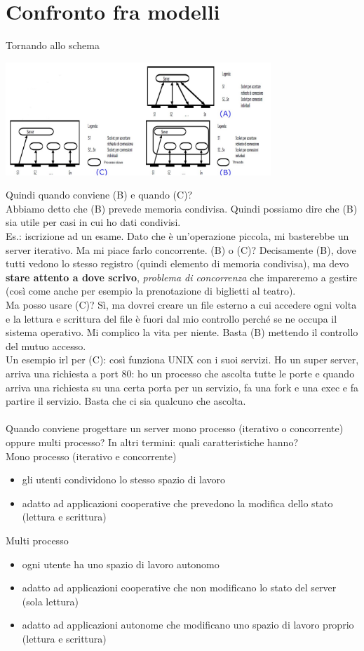 \section{Confronto fra modelli}
Tornando allo schema 
\begin{center}
    \includegraphics[width=0.75\textwidth]{img/serverConcorrenti1.jpg}
\end{center}
Quindi quando conviene (B) e quando (C)?
\\Abbiamo detto che (B) prevede memoria condivisa. Quindi possiamo dire che (B) sia utile per casi in cui ho dati condivisi.
\\Es.: iscrizione ad un esame. Dato che è un'operazione piccola, mi basterebbe un server iterativo. Ma mi piace farlo concorrente. (B) o (C)? Decisamente (B), dove tutti vedono lo stesso registro (quindi elemento di memoria condivisa), ma devo \textbf{stare attento a dove scrivo}, \textit{problema di concorrenza} che impareremo a gestire (così come anche per esempio la prenotazione di biglietti al teatro).
\\Ma posso usare (C)? Sì, ma dovrei creare un file esterno a cui accedere ogni volta e la lettura e scrittura del file è fuori dal mio controllo perché se ne occupa il sistema operativo. Mi complico la vita per niente. Basta (B) mettendo il controllo del mutuo accesso.
\\Un esempio irl per (C): così funziona UNIX con i suoi servizi. Ho un super server, arriva una richiesta a port 80: ho un processo che ascolta tutte le porte e quando arriva una richiesta su una certa porta per un servizio, fa una fork e una exec e fa partire il servizio. Basta che ci sia qualcuno che ascolta.
\\
\\Quando conviene progettare un server mono processo (iterativo o concorrente) oppure multi processo? In altri termini: quali caratteristiche hanno?
\\Mono processo (iterativo e concorrente)
\begin{itemize}
    \item gli utenti condividono lo stesso spazio di lavoro
    \item adatto ad applicazioni cooperative che prevedono la modifica dello stato (lettura e scrittura)
\end{itemize}
Multi processo
\begin{itemize}
    \item ogni utente ha uno spazio di lavoro autonomo
    \item adatto ad applicazioni cooperative che non modificano lo stato del server (sola lettura)
    \item adatto ad applicazioni autonome che modificano uno spazio di lavoro proprio (lettura e scrittura)
\end{itemize}

